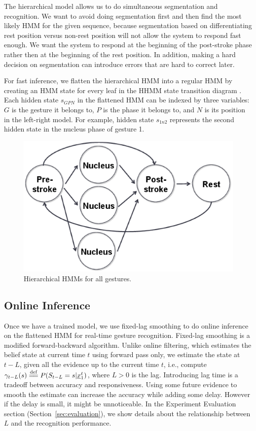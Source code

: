 \documentclass[conference]{IEEEtran}
\newcommand{\eqdef}{\overset{\mathrm{def}}{=\joinrel=}}
\begin{document}
The hierarchical model allows us to do simultaneous segmentation and
recognition. We want to avoid doing segmentation first and then find the most
likely HMM for the given sequence, because segmentation based on
differentiating rest position versus non-rest position will not allow the system
to respond fast enough. We want the system to respond at the beginning of the
post-stroke phase rather then at the beginning of the rest position. In
addition, making a hard decision on segmentation can introduce errors that
are hard to correct later. 

For fast inference, we
flatten the hierarchical HMM into a regular HMM by creating an HMM state for
every leaf in the HHMM state transition diagram \cite{murphy02}. Each
hidden state $s_{GPN}$ in the flattened HMM can be indexed by three variables:
$G$ is the gesture it belongs to, $P$ is the phase it belongs to, and $N$ is its
position in the left-right model. For example, hidden state $s_{1n2}$ represents the
second hidden state in the nucleus phase of gesture 1.

\begin{figure}[t]
\centering
\includegraphics[width=0.7\columnwidth]{fig/combined.ps}
\caption{Hierarchical HMMs for all gestures.}
\label{fig:combined}
\end{figure}

\subsection{Online Inference}
Once we have a trained model, we use fixed-lag smoothing \cite{murphy02} to do
online inference on the flattened HMM for real-time gesture recognition.
Fixed-lag smoothing is a modified forward-backward algorithm. Unlike online
filtering, which estimates the belief state at current time $t$ using forward
pass only, we estimate the state at $t - L$, given all the evidence up to the
current time $t$, i.e., compute $\gamma_{t - L}(s) \eqdef P(S_{t -
L} = s|\underline{x}_1^t)$, where $L>0$ is the lag. Introducing lag time is a
tradeoff between accuracy and responsiveness. Using some future evidence to
smooth the estimate can increase the accuracy while adding some delay. However
if the delay is small, it might be unnoticeable.
In the Experiment Evaluation section (Section~\ref{sec:evaluation}), we show
details about the relationship between $L$ and the recognition performance.
\end{document}
